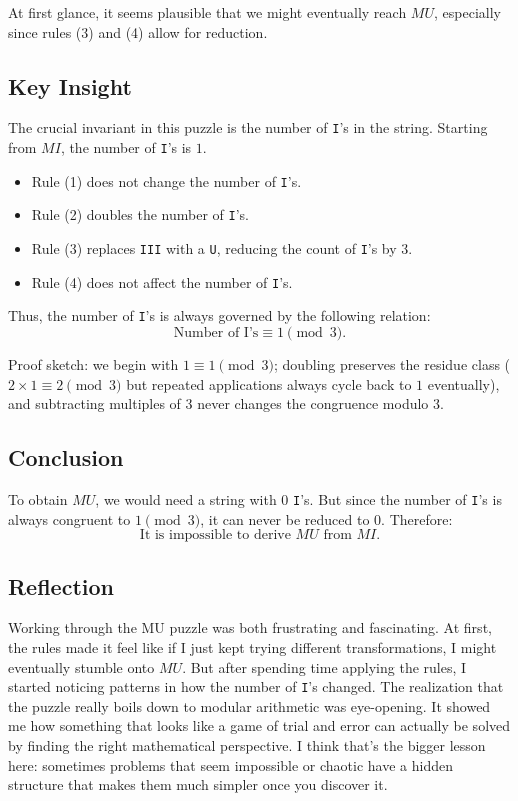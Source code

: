 \documentclass[12pt]{article}
\begin{document}
At first glance, it seems plausible that we might eventually reach $MU$, especially since rules (3) and (4) allow for reduction.

\subsection{Key Insight}
The crucial invariant in this puzzle is the number of \texttt{I}'s in the string. Starting from $MI$, the number of \texttt{I}'s is $1$.

\begin{itemize}
    \item Rule (1) does not change the number of \texttt{I}'s.
    \item Rule (2) doubles the number of \texttt{I}'s.
    \item Rule (3) replaces \texttt{III} with a \texttt{U}, reducing the count of \texttt{I}'s by $3$.
    \item Rule (4) does not affect the number of \texttt{I}'s.
\end{itemize}

Thus, the number of \texttt{I}'s is always governed by the following relation:
\[
\text{Number of I's} \equiv 1 \pmod{3}.
\]

Proof sketch: we begin with $1 \equiv 1 \pmod{3}$; doubling preserves the residue class ($2 \times 1 \equiv 2 \pmod{3}$ but repeated applications always cycle back to $1$ eventually), and subtracting multiples of $3$ never changes the congruence modulo $3$.

\subsection{Conclusion}
To obtain $MU$, we would need a string with $0$ \texttt{I}'s. But since the number of \texttt{I}'s is always congruent to $1 \pmod{3}$, it can never be reduced to $0$. Therefore:
\[
\boxed{\text{It is impossible to derive $MU$ from $MI$.}}
\]

\subsection{Reflection}
Working through the MU puzzle was both frustrating and fascinating. At first, the rules made it feel like if I just kept trying different transformations, I might eventually stumble onto $MU$. But after spending time applying the rules, I started noticing patterns in how the number of \texttt{I}'s changed. The realization that the puzzle really boils down to modular arithmetic was eye-opening. It showed me how something that looks like a game of trial and error can actually be solved by finding the right mathematical perspective. I think that’s the bigger lesson here: sometimes problems that seem impossible or chaotic have a hidden structure that makes them much simpler once you discover it.
\end{document}
